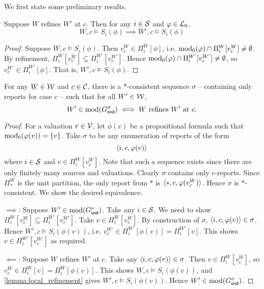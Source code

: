 We first state some preliminary results.

\begin{lemma}
    \label{lemma:local_refinement}
    Suppose $W$ refines $W'$ at $c$. Then for any $i \in \S$ and $\phi \in
    \lprop$,
    \[
        W, c \models S_i(\phi)
        \implies
        W', c \models S_i(\phi)
    \]
\end{lemma}

\begin{proof}
    Suppose $W, c \models S_i(\phi)$. Then $v^W_c \in \Pi^W_i[\phi]$, i.e.
    $\propmods(\phi) \cap \Pi^W_i[v^W_c] \ne \emptyset$. By refinement,
    $\Pi^W_i[v^W_c] \subseteq \Pi^{W'}_i[v^{W'}_c]$. Hence $\propmods(\phi)
    \cap \Pi^{W'}_i[v^{W'}_c] \ne \emptyset$, so $v^{W'}_c \in
    \Pi^{W'}_i[\phi]$. That is, $W', c \models S_i(\phi)$.
\end{proof}

\begin{lemma}
    \label{lemma:local_refinement_sequence}
    For any $W \in \W$ and $c \in \C$, there is a $\ast$-consistent sequence
    $\sigma$ -- containing only reports for case $c$ -- such that for all $W'
    \in \W$,
    \[
        W' \in \mods(G^\sigma_\snd)
        \iff
        W \text{ refines } W' \text{ at } c.
    \]
\end{lemma}

\begin{proof}

    For a valuation $v \in \vals$, let $\phi(v)$ be a propositional formula
    such that $\propmods(\phi(v)) = \{v\}$. Take $\sigma$ to be any enumeration
    of reports of the form
    \[
        \tuple{i, c, \phi(v)}
    \]
    where $i \in \S$ and $v \in \Pi^W_i[v^W_c]$. Note that such a sequence
    exists since there are only finitely many sources and valuations. Clearly
    $\sigma$ contains only $c$-reports. Since $\Pi^W_\ast$ is the unit
    partition, the only report from $\ast$ is $\tuple{\ast, c, \phi(v^W_c)}$.
    Hence $\sigma$ is $\ast$-consistent. We show the desired equivalence.

    $\implies$: Suppose $W' \in \mods(G^\sigma_\snd)$. Take any $i \in \S$. We
    need to show $\Pi^W_i[v^W_c] \subseteq \Pi^{W'}_i[v^{W'}_c]$. Take $v \in
    \Pi^W_i[v^W_c]$. By construction of $\sigma$, $\tuple{i, c, \phi(v)} \in
    \sigma$. Hence $W', c \models S_i(\phi(v))$, i.e. $v^{W'}_c \in
    \Pi^{W'}_i[\phi(v)] = \Pi^{W'}_i[v]$. This shows $v \in
    \Pi^{W'}_i[v^{W'}_c]$ as required.

    $\impliedby$: Suppose $W$ refines $W'$ at $c$. Take any $\tuple{i, c,
    \phi(v)} \in \sigma$. Then $v \in \Pi^W_i[v^W_c]$, so $v^W_c \in \Pi^W_i[v]
    = \Pi^W_i[\phi(v)]$. This shows $W, c \models S_i(\phi(v))$, and
    \cref{lemma:local_refinement} gives $W', c \models S_i(\phi(v))$. Hence $W'
    \in \mods(G^\sigma_\snd)$.

\end{proof}

